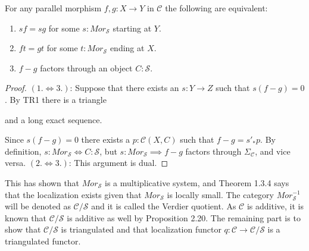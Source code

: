    \begin{prop}
        For any parallel morphism $f,g:X\rightarrow Y$ in $\mathcal{C}$ the following are equivalent:
        \begin{enumerate}
            \item $sf=sg$ for some $s:Mor_\mathcal{S}$ starting at $Y$.
            \item $ft=gt$ for some $t:Mor_\mathcal{S}$ ending at $X$.
            \item $f-g$ factors through an object $C:\mathcal{S}$.
        \end{enumerate}
    \end{prop}

    \begin{proof}
        $(1.\iff 3.)$:
        Suppose that there exists an $s:Y\rightarrow Z$ such that $s(f-g)=0$. By TR1 there is a triangle  and a long exact sequence.
        \begin{center}
        \end{center}
        Since $s(f-g)=0$ there exists a $p:\mathcal{C}(X,C)$ such that $f-g = s'_*p$. By definition, $s:Mor_\mathcal{S}\iff C:\mathcal{S}$, but $s:Mor_\mathcal{S}\implies f-g$ factors through $\Sigma_{\mathcal{C}}$, and vice versa.
        $(2.\iff 3.)$:
        This argument is dual.
    \end{proof}

    This has shown that $Mor_\mathcal{S}$ is a multiplicative system, and Theorem 1.3.4 says that the localization exists given that $Mor_\mathcal{S}$ is locally small. The category $Mor_\mathcal{S}^{-1}$ will be denoted as $\mathcal{C}/\mathcal{S}$ and it is called the Verdier quotient. As $\mathcal{C}$ is additive, it is known that $\mathcal{C}/\mathcal{S}$ is additive as well by Proposition 2.20. The remaining part is to show that $\mathcal{C}/\mathcal{S}$ is triangulated and that localization functor $q:\mathcal{C}\rightarrow \mathcal{C}/\mathcal{S}$ is a triangulated functor.

